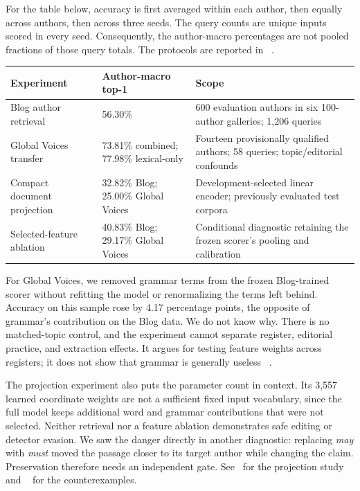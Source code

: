 For the table below, accuracy is first averaged within each author, then equally
across authors, then across three seeds. The query counts are unique inputs
scored in every seed. Consequently, the author-macro percentages are not pooled
fractions of those query totals. The protocols are reported in
~\cite{projection,gvtransfer}.

\par\medskip\noindent
\begin{tabularx}{\linewidth}{@{}LLL@{}}
\toprule
Experiment & Author-macro top-1 & Scope \\
\midrule
Blog author retrieval & 56.30\% & 600 evaluation authors in six
100-author galleries; 1,206 queries \\
Global Voices transfer & 73.81\% combined; 77.98\% lexical-only &
Fourteen provisionally qualified authors; 58 queries; topic/editorial
confounds \\
Compact document projection & 32.82\% Blog; 25.00\% Global Voices &
Development-selected linear encoder; previously evaluated test
corpora \\
Selected-feature ablation & 40.83\% Blog; 29.17\%
Global Voices & Conditional diagnostic retaining the frozen scorer's pooling and
calibration \\
\bottomrule
\end{tabularx}
\par\medskip

For Global Voices, we removed grammar terms from the
frozen Blog-trained scorer without refitting the model or renormalizing the
terms left behind. Accuracy on this sample rose by 4.17 percentage points, the
opposite of grammar's contribution on the Blog data. We do not know why. There
is no matched-topic control, and the experiment cannot separate register,
editorial practice, and extraction effects. It argues for testing feature
weights across registers; it does not show that grammar is generally useless
~\cite{gvtransfer}.

The projection experiment also puts the parameter count in context. Its 3,557
learned coordinate weights are not a sufficient fixed input vocabulary, since
the full model keeps additional word and grammar contributions that were not
selected. Neither retrieval nor a feature ablation demonstrates safe editing or
detector evasion. We saw the danger directly in another diagnostic: replacing
\emph{may} with \emph{must} moved the passage closer to its target author while
changing the claim. Preservation therefore needs an independent gate.
See~\cite{projection} for the projection study and
~\cite{editcounterexamples} for the counterexamples.

